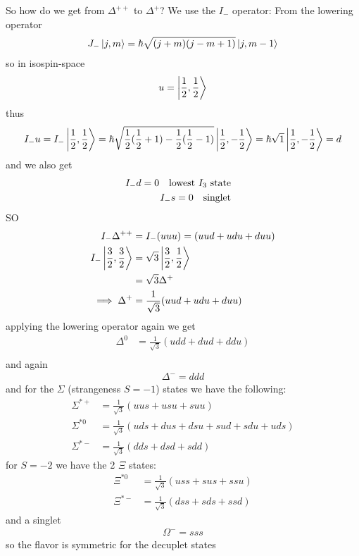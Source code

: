 \documentclass[../main.tex]{subfiles}
\begin{document}
\begin{itemize}
    So how do we get from $\Delta^{++}$ to $\Delta^+$? We use the $I_-$ operator:
    From the lowering operator
    \begin{align*}
        J_- \ket{j, m} = \hbar \sqrt{(j + m)(j - m + 1)} \ket{j, m-1}
    \end{align*}
    so in isospin-space
    \begin{align*}
        u = \ket{\frac{1}{2}, \frac{1}{2}}
    \end{align*}
    thus
    \begin{align*}
        I_- u = I_- \ket{\frac{1}{2}, \frac{1}{2}} = \hbar \sqrt{\frac{1}{2}(\frac{1}{2} + 1) - \frac{1}{2}(\frac{1}{2} - 1)} \ket{\frac{1}{2}, -\frac{1}{2}}
            = \hbar \sqrt{1} \ket{\frac{1}{2}, -\frac{1}{2}} = d
    \end{align*}
    and we also get
    \begin{align*}
        I_- d = 0 \qqtext{lowest $I_3$ state} \\
        I_- s = 0 \qqtext{singlet}
    \end{align*}
    SO 
    \begin{align*}
        I_- \Delta^{++} &= I_- (uuu) =  (uud + udu + duu) \\
        I_- \ket{\frac{3}{2}, \frac{3}{2}} &= \sqrt{3} \ket{\frac{3}{2}, \frac{1}{2}} \\
        &= \sqrt{3} \Delta^+ \\
        \implies \Delta^+ &= \frac{1}{\sqrt{3}} (uud + udu + duu)
    \end{align*}
    applying the lowering operator again we get
    \begin{align*}
        \Delta^0 &= \frac{1}{\sqrt{3}} (udd + dud + ddu) \\
    \end{align*}
    and again
    \begin{align*}
        \Delta^- = ddd
    \end{align*}
    and for the $\Sigma$ (strangeness $S = -1$) states we have the following:
    \begin{align*}
        \Sigma^{*+} &= \frac{1}{\sqrt{3}} (uus + usu + suu) \\
        \Sigma^{*0} &= \frac{1}{\sqrt{3}} (uds + dus + dsu + sud + sdu + uds) \\
        \Sigma^{*-} &= \frac{1}{\sqrt{3}} (dds + dsd + sdd)
    \end{align*}
    for $S = -2$ we have the 2 $\Xi$ states:
    \begin{align*}
        \Xi^{*0} &= \frac{1}{\sqrt{3}} (uss + sus + ssu) \\
        \Xi^{*-} &= \frac{1}{\sqrt{3}} (dss + sds + ssd)
    \end{align*}
    and a singlet 
    \begin{align*}
        \Omega^- = sss
    \end{align*}
    so the flavor is symmetric for the decuplet states

\end{itemize}
\end{document}
